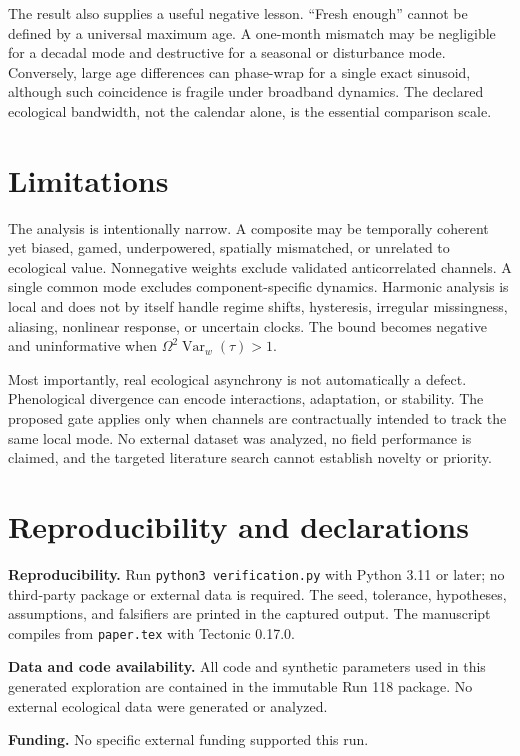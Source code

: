 \documentclass[10pt]{article}
\newcommand{\Var}{\operatorname{Var}}
\begin{document}
The result also supplies a useful negative lesson.  ``Fresh enough'' cannot be
defined by a universal maximum age.  A one-month mismatch may be negligible for
a decadal mode and destructive for a seasonal or disturbance mode.  Conversely,
large age differences can phase-wrap for a single exact sinusoid, although such
coincidence is fragile under broadband dynamics.  The declared ecological
bandwidth, not the calendar alone, is the essential comparison scale.

\section{Limitations}

The analysis is intentionally narrow.  A composite may be temporally coherent
yet biased, gamed, underpowered, spatially mismatched, or unrelated to ecological
value.  Nonnegative weights exclude validated anticorrelated channels.  A single
common mode excludes component-specific dynamics.  Harmonic analysis is local
and does not by itself handle regime shifts, hysteresis, irregular missingness,
aliasing, nonlinear response, or uncertain clocks.  The bound becomes negative
and uninformative when $\Omega^2\Var_w(\tau)>1$.

Most importantly, real ecological asynchrony is not automatically a defect.
Phenological divergence can encode interactions, adaptation, or stability.  The
proposed gate applies only when channels are contractually intended to track the
same local mode.  No external dataset was analyzed, no field performance is
claimed, and the targeted literature search cannot establish novelty or
priority.

\section{Reproducibility and declarations}

\textbf{Reproducibility.}  Run \texttt{python3 verification.py} with Python
3.11 or later; no third-party package or external data is required.  The seed,
tolerance, hypotheses, assumptions, and falsifiers are printed in the captured
output.  The manuscript compiles from \texttt{paper.tex} with Tectonic 0.17.0.

\textbf{Data and code availability.}  All code and synthetic parameters used
in this generated exploration are contained in the immutable Run 118 package.
No external ecological data were generated or analyzed.

\textbf{Funding.}  No specific external funding supported this run.
\end{document}
